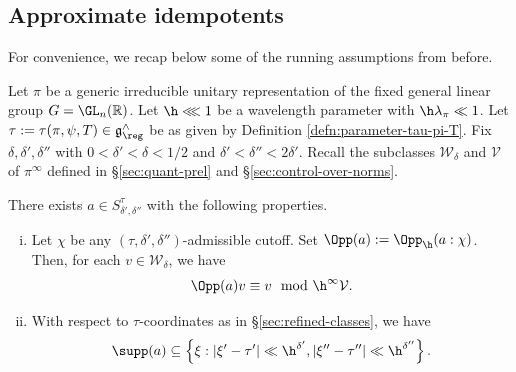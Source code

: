 \subsection{Approximate idempotents}\label{sec:appr-idemp}
For convenience, we recap below some of the running assumptions from before.
\begin{theorem}\label{thm:appr-idemp}
  Let $\pi$ be a generic irreducible unitary representation of the fixed general linear group $G = \GL_n(\mathbb{R})$.  Let $\h \lll 1$ be a wavelength parameter with $\h \lambda_\pi \ll 1$.  Let $\tau := \tau(\pi,\psi,T) \in \mathfrak{g}^\wedge_{\reg}$ be as given by Definition \ref{defn:parameter-tau-pi-T}.  Fix $\delta, \delta ', \delta ''$ with $0 < \delta ' < \delta < 1/2$ and $\delta ' < \delta '' < 2 \delta '$.  Recall the subclasses $\mathcal{W}_\delta$ and $\mathcal{V}$ of $\pi^\infty$ defined in \S\ref{sec:quant-prel} and \S\ref{sec:control-over-norms}.

  There exists $a \in S^\tau_{\delta ', \delta ''}$ with the following properties.
  \begin{enumerate}[(i)]
  \item Let $\chi$ be any $(\tau,\delta ',\delta '')$-admissible cutoff.  Set $\Opp(a) := \Opp_{\h}(a:\chi)$.  Then, for each $v \in \mathcal{W}_\delta$, we have
    \begin{equation}\label{eq:oppa-v-equiv}
      \Opp(a) v \equiv v \mod{\h^\infty \mathcal{V}}.
    \end{equation}
  \item With respect to $\tau$-coordinates as in \S\ref{sec:refined-classes}, we have
    \begin{equation}\label{eqn:a-desired-support-condition}
      \supp(a)
      \subseteq
      \left\{ \xi :
        |\xi ' - \tau '| \ll \h^{\delta '},
        |\xi '' - \tau ''| \ll \h^{\delta ''}
      \right\}.
    \end{equation}
  \end{enumerate}
\end{theorem}
